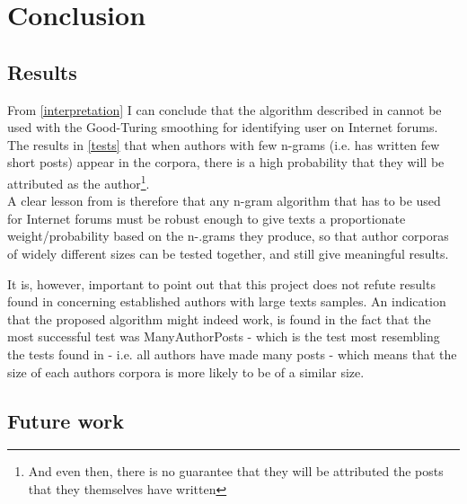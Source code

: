 \section{Conclusion}
\label{conclusion}

\subsection{Results}
From \ref{interpretation} I can conclude that the algorithm described in \cite{nr4} cannot be used with the Good-Turing smoothing for identifying user on Internet forums. The results in \ref{tests} that when authors with few n-grams (i.e. has written few short posts) appear in the corpora, there is a high probability that they will be attributed as the author\footnote{And even then, there is no guarantee that they will be attributed the posts that they themselves have written}.\\

A clear lesson from \cite{nr4} is therefore that any n-gram algorithm that has to be used for Internet forums must be robust enough to give texts a proportionate weight/probability based on the n-.grams they produce, so that author corporas of widely different sizes can be tested together, and still give meaningful results. 

It is, however, important to point out that this project does not refute results found in \cite{nr4} concerning established authors with large texts samples. An indication that the proposed algorithm might indeed work, is found in the fact that the most successful test was ManyAuthorPosts - which is the test most resembling the tests found in \cite{nr4} - i.e. all authors have made many posts - which means that the size of each authors corpora is more likely to be of a similar size.\\

\subsection{Future work}

